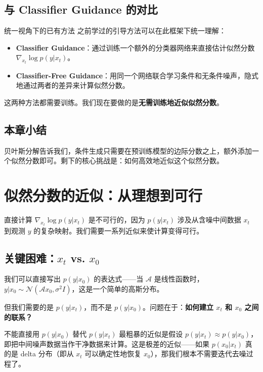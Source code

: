 \documentclass[a4paper]{article}
\begin{document}
\subsection{与 Classifier Guidance 的对比}

\begin{knowledgebox}{统一视角下的已有方法}
之前学过的引导方法可以在此框架下统一理解：
\begin{itemize}
    \item \textbf{Classifier Guidance}：通过训练一个额外的分类器网络来直接估计似然分数 $\nabla_{x_t} \log p(y | x_t)$。
    \item \textbf{Classifier-Free Guidance}：用同一个网络联合学习条件和无条件噪声，隐式地通过两者的差异来计算似然分数。
\end{itemize}
这两种方法都需要训练。我们现在要做的是\textbf{无需训练地近似似然分数}。
\end{knowledgebox}

\subsection{本章小结}

贝叶斯分解告诉我们，条件生成只需要在预训练模型的边际分数之上，额外添加一个似然分数即可。剩下的核心挑战是：如何高效地近似这个似然分数。


\section{似然分数的近似：从理想到可行}

直接计算 $\nabla_{x_t} \log p(y | x_t)$ 是不可行的，因为 $p(y | x_t)$ 涉及从含噪中间数据 $x_t$ 到观测 $y$ 的复杂映射。我们需要一系列近似来使计算变得可行。

\subsection{关键困难：$x_t$ vs. $x_0$}

我们可以直接写出 $p(y | x_0)$ 的表达式——当 $\mathcal{A}$ 是线性函数时，$y | x_0 \sim \mathcal{N}(\mathcal{A} x_0, \sigma^2 I)$，这是一个简单的高斯分布。

但我们需要的是 $p(y | x_t)$，而不是 $p(y | x_0)$。问题在于：\textbf{如何建立 $x_t$ 和 $x_0$ 之间的联系？}

\begin{warningbox}{不能直接用 $p(y|x_0)$ 替代 $p(y|x_t)$}
最粗暴的近似是假设 $p(y|x_t) \approx p(y|x_0)$，即把中间噪声数据当作干净数据来计算。这是极差的近似——如果 $p(x_0|x_t)$ 真的是 delta 分布（即从 $x_t$ 可以确定性地恢复 $x_0$），那我们根本不需要迭代去噪过程了。
\end{warningbox}
\end{document}
